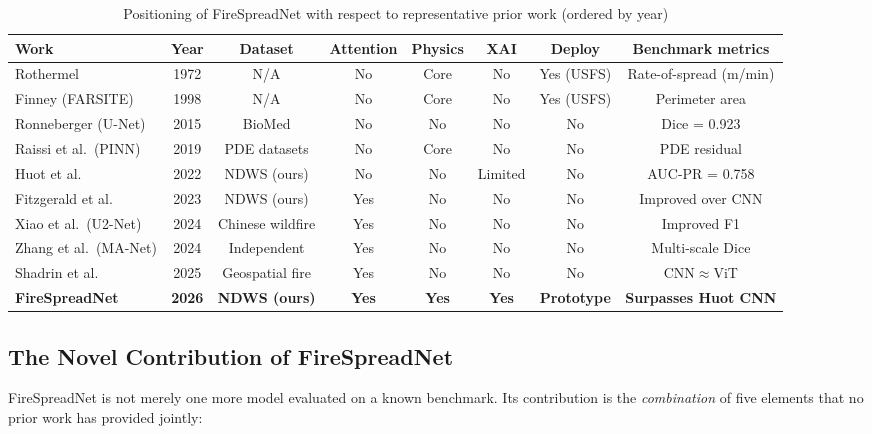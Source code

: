 \begin{table}[H]
    \centering
    \caption{Positioning of FireSpreadNet with respect to representative prior work (ordered by year)}
    \label{tab:sota_positioning}
    \renewcommand{\arraystretch}{1.3}
    \begin{tabular}{|l|c|c|c|c|c|c|c|}
        \hline
        \textbf{Work} & \textbf{Year} & \textbf{Dataset} & \textbf{Attention} & \textbf{Physics} & \textbf{XAI} & \textbf{Deploy} & \textbf{Benchmark metrics} \\
        \hline\hline
        Rothermel & 1972 & N/A & No & Core & No & Yes (USFS) & Rate-of-spread (m/min) \\
        Finney (FARSITE) & 1998 & N/A & No & Core & No & Yes (USFS) & Perimeter area \\
        Ronneberger (U-Net) & 2015 & BioMed & No & No & No & No & Dice = 0.923 \\
        Raissi et al.\ (PINN) & 2019 & PDE datasets & No & Core & No & No & PDE residual \\
        Huot et al. & 2022 & NDWS (ours) & No & No & Limited & No & AUC-PR = 0.758 \\
        Fitzgerald et al. & 2023 & NDWS (ours) & Yes & No & No & No & Improved over CNN \\
        Xiao et al.\ (U2-Net) & 2024 & Chinese wildfire & Yes & No & No & No & Improved F1 \\
        Zhang et al.\ (MA-Net) & 2024 & Independent & Yes & No & No & No & Multi-scale Dice \\
        Shadrin et al. & 2025 & Geospatial fire & Yes & No & No & No & CNN$\approx$ViT \\
        \textbf{FireSpreadNet} & \textbf{2026} & \textbf{NDWS (ours)} & \textbf{Yes} & \textbf{Yes} & \textbf{Yes} & \textbf{Prototype} & \textbf{Surpasses Huot CNN} \\
        \hline
    \end{tabular}
\end{table}

\subsection{The Novel Contribution of FireSpreadNet}

FireSpreadNet is not merely one more model evaluated on a known benchmark.
Its contribution is the \emph{combination} of five elements that no prior work has provided jointly:

